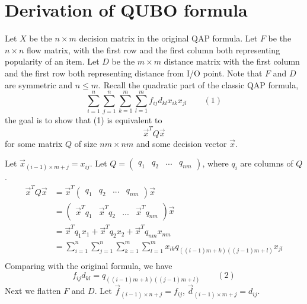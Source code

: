 \documentclass[hyp]{socreport}
\begin{document}
\chapter{Derivation of QUBO formula}
Let $X$ be the $n \times m$ decision matrix in the original QAP formula. Let $F$ be the $n\times n$ flow matrix, with the first row and the first column both representing popularity of an item. Let $D$ be the $m\times m$ distance matrix with the first column and the first row both representing distance from I/O point. Note that $F$ and $D$ are symmetric and $n\leq m$. Recall the quadratic part of the classic QAP formula,
\[\sum_{i=1}^{n}\sum_{j=1}^{n}\sum_{k=1}^{m}\sum_{l=1}^{m}f_{ij}d_{kl}x_{ik}x_{jl} \qquad (1)\]
the goal is to show that (1) is equivalent to
\[\vec{x}^TQ\vec{x}\]
for some matrix $Q$ of size $nm\times nm$ and some decision vector $\vec{x}$.\par
Let $\vec{x}_{(i-1)\times m + j} = x_{ij}$.
\singlespacing
Let $Q = \begin{pmatrix}q_1&q_2&...&q_{nm}\end{pmatrix}$, where $q_i$ are columns of $Q$.
\begin{equation}
\begin{split}
\vec{x}^TQ\vec{x} & = \vec{x}^T \begin{pmatrix}q_1&q_2&...&q_{nm}\end{pmatrix} \vec{x} \\
				  & = \begin{pmatrix}\vec{x}^Tq_1&\vec{x}^Tq_2&...&\vec{x}^Tq_{nm}\end{pmatrix}\vec{x} \\
				  & = \vec{x}^Tq_1x_1 + \vec{x}^Tq_2x_2  + \vec{x}^Tq_{nm}x_{nm}\\
				  & = \sum_{i=1}^{n}\sum_{j=1}^{n}\sum_{k=1}^{m}\sum_{l=1}^{m}x_{ik}q_{((i-1)m+k)((j-1)m+l)}x_{jl} \\
\end{split}
\end{equation}
Comparing with the original formula, we have
\[f_{ij}d_{kl} = q_{((i-1)m+k)((j-1)m+l)}\qquad (2)\] 
Next we flatten $F$ and $D$.
Let $\vec{f}_{(i-1)\times n + j} = f_{ij}$, $\vec{d}_{(i-1)\times m + j} = d_{ij}$.
\end{document}

